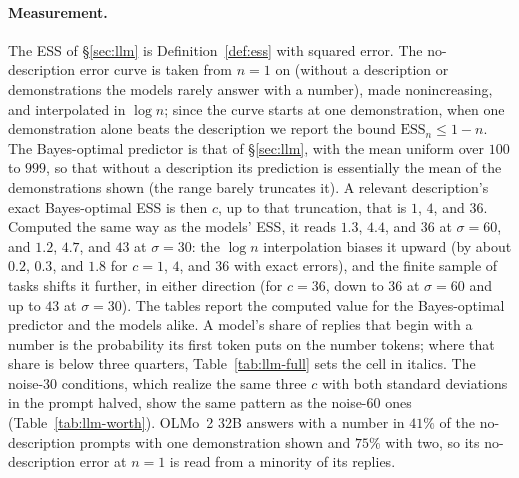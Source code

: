 \documentclass{article}
\newcommand{\ess}{\mathrm{ESS}}
\begin{document}
\paragraph{Measurement.} The ESS of \S\ref{sec:llm} is Definition~\ref{def:ess} with squared error. The no-description error curve is taken from $n = 1$ on (without a description or demonstrations the models rarely answer with a number), made nonincreasing, and interpolated in $\log n$; since the curve starts at one demonstration, when one demonstration alone beats the description we report the bound $\ess_n \le 1 - n$. The Bayes-optimal predictor is that of \S\ref{sec:llm}, with the mean uniform over $100$ to $999$, so that without a description its prediction is essentially the mean of the demonstrations shown (the range barely truncates it). A relevant description's exact Bayes-optimal ESS is then $c$, up to that truncation, that is $1$, $4$, and $36$. Computed the same way as the models' ESS, it reads $1.3$, $4.4$, and $36$ at $\sigma = 60$, and $1.2$, $4.7$, and $43$ at $\sigma = 30$: the $\log n$ interpolation biases it upward (by about $0.2$, $0.3$, and $1.8$ for $c = 1$, $4$, and $36$ with exact errors), and the finite sample of tasks shifts it further, in either direction (for $c = 36$, down to $36$ at $\sigma = 60$ and up to $43$ at $\sigma = 30$). The tables report the computed value for the Bayes-optimal predictor and the models alike. A model's share of replies that begin with a number is the probability its first token puts on the number tokens; where that share is below three quarters, Table~\ref{tab:llm-full} sets the cell in italics. The noise-$30$ conditions, which realize the same three $c$ with both standard deviations in the prompt halved, show the same pattern as the noise-$60$ ones (Table~\ref{tab:llm-worth}). OLMo~2 32B answers with a number in $41\%$ of the no-description prompts with one demonstration shown and $75\%$ with two, so its no-description error at $n = 1$ is read from a minority of its replies.
\end{document}
